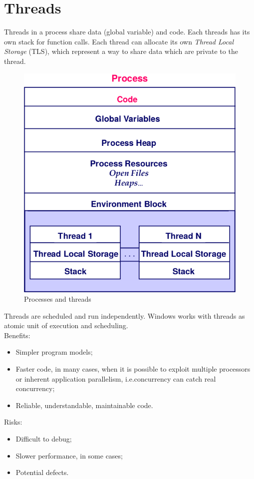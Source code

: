 \chapter{Threads}
Threads in a process share data (global variable) and code. Each threads has its own stack for function calls. Each thread can allocate its own \emph{Thread Local Storage} (TLS), which represent a way to share data which are private to the thread.

\begin{figure}[hbtp]
\centering
\includegraphics[scale=0.35]{images/windows_threads/process_threads.png}
\caption{Processes and threads}
\end{figure}

Threads are scheduled and run independently. Windows works with threads as atomic unit of execution and scheduling.
\\
Benefits:
\begin{itemize}
\item Simpler program models;
\item Faster code, in many cases, when it is possible to exploit multiple processors or inherent application parallelism, i.e.\@ concurrency can catch real concurrency;
\item Reliable, understandable, maintainable code.
\end{itemize}
Risks:
\begin{itemize}
\item Difficult to debug;
\item Slower performance, in some cases;
\item Potential defects.
\end{itemize}

